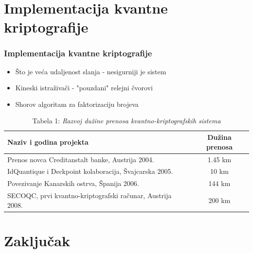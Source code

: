 \documentclass{beamer}
\begin{document}
\section{Implementacija kvantne kriptografije}
\begin{frame}[fragile]\frametitle{Implementacija kvantne kriptografije}
	\begin{itemize}
	    \item Što je veća udaljenost slanja - nesigurniji je sistem
        \item Kineski istraživači - "pouzdani" relejni čvorovi
        \item Shorov algoritam za faktorizaciju brojeva
	\end{itemize}
 {\scriptsize
\begin{table}[h]
\centering
\begin{tabular}{|l|c|}
\hline
\textbf{Naziv i godina projekta}                           & \textbf{Dužina prenosa} \\ \hline
Prenos novca Creditanstalt banke, Austrija 2004.           & 1.45 km                 \\ \hline
IdQuantique i Deckpoint kolaboracija, Švajcarska 2005.     & 10 km                   \\ \hline
Povezivanje Kanarskih ostrva, Španija 2006.                & 144 km                  \\ \hline
SECOQC, prvi kvantno-kriptografski računar, Austrija 2008. & 200 km                  \\ \hline
\end{tabular}
\caption{Tabela 1: \emph{Razvoj dužine prenosa kvantno-kriptografskih sistema}}

\label{tabela:kvantnaxxii}
\end{table}
}
\end{frame}

\section{Zaključak}
\end{document}
